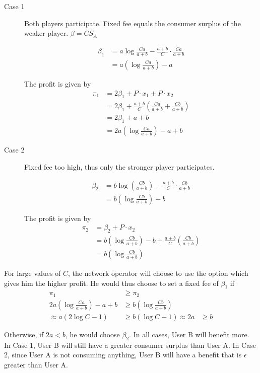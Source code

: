 \documentclass[]{article}
\newcommand{\e}{&=}
\begin{document}
\begin{description}
\item[Case 1] Both players participate. Fixed fee equals the consumer surplus of the weaker player. $\beta = CS_A$

\begin{align*}
\beta_1 \e a \log \frac{Ca}{a + b} - \frac{a + b}{C} \cdot \frac{Ca}{a + b} \\
\e a \left( \log \frac{Ca}{a + b} \right) - a
\end{align*}

The profit is given by
\begin{align*}
\pi_1 \e 2 \beta_1 + P \cdot x_1 + P \cdot x_2 \\
\e 2 \beta_1 + \frac{a + b}{C} \left( \frac{Ca}{a + b} + \frac{Cb}{a + b} \right) \\
\e 2 \beta_1 + a + b \\
\e 2a \left( \log \frac{Ca}{a + b} \right) - a + b
\end{align*}

\item[Case 2] Fixed fee too high, thus only the stronger player participates.

\begin{align*}
\beta_2 \e b \log \left( \frac{Cb}{a + b} \right) - \frac{a + b}{C} \cdot \frac{Cb}{a + b} \\
\e b \left( \log \frac{Cb}{a + b} \right) - b
\end{align*}

The profit is given by
\begin{align*}
\pi_2 \e \beta_2 + P \cdot x_2 \\
\e b \left( \log \frac{Cb}{a + b} \right) - b + \frac{a + b}{C} \left( \frac{Cb}{a + b} \right) \\
\e b \left( \log \frac{Cb}{a + b} \right)
\end{align*}
\end{description}

For large values of $C$, the network operator will choose to use the option which gives him the higher profit. He would thus choose to set a fixed fee of $\beta_1$ if
\begin{align*}
\pi_1 &\geq \pi_2 \\
2a \left( \log \frac{Ca}{a + b} \right) - a + b &\geq b \left( \log \frac{Cb}{a + b} \right) \\
\approx a \left( 2 \log C - 1 \right) &\geq b \left( \log C - 1 \right)
\approx 2a &\geq b
\end{align*}

Otherwise, if $2a < b$, he would choose $\beta_2$. In all cases, User B will benefit more. In Case 1, User B will still have a greater consumer surplus than User A. In Case 2, since User A is not consuming anything, User B will have a benefit that is $\epsilon$ greater than User A. 
\end{document}
